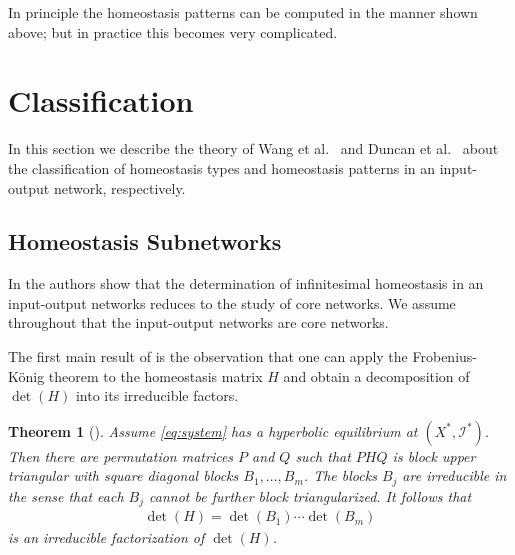 \documentclass[a4paper,fleqn]{cas-dc}
\newcommand{\II}{{\mathcal I}}
\newtheorem{theorem}{Theorem}[section]
\newcommand{\END}{\hfill\mbox{\raggedright \mbox{\raisebox{2pt}{\scalebox{0.6}{$\Diamond$}}}}\medskip}
\newcommand{\etal}{\textrm{et al.}}
\begin{document}
In principle the homeostasis patterns can be computed in the manner shown above; but in practice this becomes very complicated.




\section{Classification}
\label{SEC:CLASS}

In this section we describe the theory of Wang \etal~\cite{wang2021} and Duncan \etal~\cite{duncan2024} about the classification of homeostasis types and homeostasis patterns in an input-output network, respectively. 

\subsection{Homeostasis Subnetworks}

In \cite{wang2021} the authors show that the determination of infinitesimal homeostasis in an input-output networks reduces to the study of core networks. 
We assume throughout that the input-output networks are core networks.  

The first main result of \cite{wang2021} is the observation that one can apply the Frobenius-K\"onig \cite{schneider1977,brualdi1991} theorem to the homeostasis matrix $H$ and obtain a decomposition of $\det(H)$ into its irreducible factors.

\begin{theorem}[{\cite[Theorem 1.11]{wang2021}}] \label{thm:irreducible}
Assume \eqref{eq:system} has a hyperbolic equilibrium at $(X^*,\II^*)$. 
Then there are permutation matrices $P$ and $Q$ such that $PHQ$ is block upper triangular with square diagonal blocks $B_1,\ldots,B_m$. 
The blocks $B_j$ are irreducible in the sense that each $B_j$ cannot be further block triangularized. It follows that 
\begin{align}\label{eq:irreducible}
\det(H) = \det(B_1)\cdots\det(B_m)
\end{align}
is an irreducible factorization of $\det(H)$. 
\end{theorem}

\end{document}
